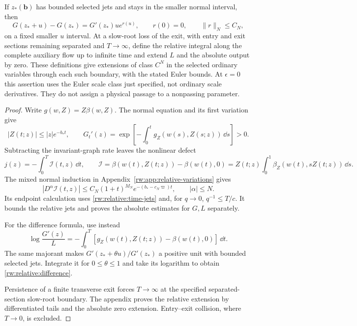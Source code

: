 \begin{proposition}
If $z_*(\mathbf b)$ has bounded selected jets and stays in the smaller
normal interval, then
\begin{equation}\label{rw:relative:difference}
 G(z_*+u)-G(z_*)=G'(z_*)u e^{r(u)},\qquad
 r(0)=0,\qquad \|r\|_{N}\le C_N,
\end{equation}
on a fixed smaller $u$ interval. At a slow-root loss of the exit,
with entry and exit sections remaining separated and $T\to\infty$,
define the relative
integral along the complete auxiliary flow up to infinite time and
extend $L$ and the absolute output by zero. These definitions give
extensions of class $C^N$ in the selected ordinary variables through
each such boundary, with the stated Euler bounds.
At $\epsilon=0$ this assertion uses the Euler scale class just specified,
not ordinary scale derivatives. They do not assign a physical passage
to a nonpassing parameter.
\end{proposition}

\begin{proof}
Write $g(w,Z)=Z\beta(w,Z)$. The normal equation and its first variation
give
\[
 |Z(t;z)|\le |z|e^{-b_*t},\qquad
 G_t'(z)=\exp\left[-\int_0^t g_Z(w(s),Z(s;z))\,\dd s\right]>0.
\]
Subtracting the invariant-graph rate leaves the nonlinear defect
\begin{equation}\label{rw:relative:integral}
 j(z)=-\int_0^T\mathcal I(t,z)\,\dd t,\qquad
 \mathcal I=\beta(w(t),Z(t;z))-\beta(w(t),0)
 =Z(t;z)\int_0^1\beta_Z(w(t),sZ(t;z))\,\dd s.
\end{equation}
The mixed normal induction in Appendix~\ref{rw:app:relative-variations} gives
\begin{equation}\label{rw:relative:majorant}
 |D^\alpha\mathcal I(t,z)|
 \le C_N(1+t)^{M_N}e^{-(b_*-c_N\varpi)t},\qquad |\alpha|\le N.
\end{equation}
Its endpoint calculation uses \eqref{rw:relative:time-jets} and, for
$q\to0$, $q^{-1}\le T/c$. It bounds the relative jets and proves the
absolute estimates for $G,L$ separately.

For the difference formula, use instead
\[
 \log\frac{G'(z)}{L}
 =-\int_0^T[g_Z(w(t),Z(t;z))-\beta(w(t),0)]\,\dd t.
\]
The same majorant makes
$G'(z_*+\theta u)/G'(z_*)$ a positive unit with bounded
selected jets. Integrate it for $0\le\theta\le1$ and take its logarithm
to obtain \eqref{rw:relative:difference}.

Persistence of a finite transverse exit forces $T\to\infty$ at the
specified separated-section slow-root boundary. The appendix proves the
relative extension by differentiated tails and the absolute zero extension.
Entry--exit collision, where $T\to0$, is excluded.
\end{proof}

